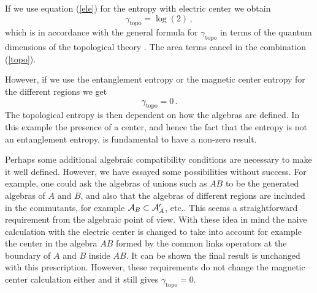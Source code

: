 \documentclass[12pt,a4paper]{article}
\newcommand{\be}{\begin{equation}}
\newcommand{\ee}{\end{equation}}
\def\be{\begin{equation}}
\def\ee{\end{equation}}
\begin{document}
If we use equation (\ref{ele}) for the entropy with electric center we obtain 
\be
\gamma_{\textrm{topo}}=\log(2)\,, \label{pppo}
\ee
which is in accordance with the general formula for $\gamma_{\textrm{topo}}$ in terms of the quantum dimensions of the topological theory \cite{Wen}.
The area terms cancel in the combination (\ref{topo}).


However, if we use the entanglement entropy or the magnetic center entropy for the different regions we get 
\be
\gamma_{\textrm{topo}}=0\,. 
\ee
The topological entropy is then dependent on how the algebras are defined. In this example the presence 
of a center, and hence the fact that the entropy is not an entanglement entropy, is fundamental to have a non-zero result.

Perhaps some additional algebraic compatibility conditions are necessary to make it well defined. However, we have essayed some 
possibilities without success. For example, one could ask the algebras of unions such as $AB$ to be the generated algebras of $A$ and $B$, 
and also that the algebras of different regions are included in the commutants, for example ${\cal A}_B\subset {\cal A}_A^\prime$, etc.. 
This seems a straightforward requirement from the algebraic point of view. With these idea in mind the naive calculation with the electric 
center is changed to take into account for example the center in the algebra $AB$ formed by the common links operators at the boundary of $A$ and $B$ inside $AB$. It can be shown the final result is unchanged with this prescription. However, these requirements do 
not change the magnetic center calculation either and it still gives $\gamma_{\textrm{topo}}=0$.
 
\end{document}
